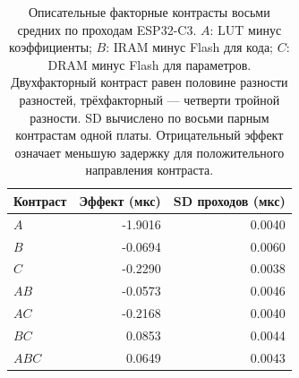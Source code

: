 \begin{table}[H]
\centering
\caption{Описательные факторные контрасты восьми средних по проходам ESP32-C3. $A$: LUT минус коэффициенты; $B$: IRAM минус Flash для кода; $C$: DRAM минус Flash для параметров. Двухфакторный контраст равен половине разности разностей, трёхфакторный --- четверти тройной разности. SD вычислено по восьми парным контрастам одной платы. Отрицательный эффект означает меньшую задержку для положительного направления контраста.}
\label{tab:c3-factorial}
\begin{tabular}{lrr}
\toprule
Контраст & Эффект (мкс) & SD проходов (мкс)\\
\midrule
$A$ & -1.9016 & 0.0040\\
$B$ & -0.0694 & 0.0060\\
$C$ & -0.2290 & 0.0038\\
$AB$ & -0.0573 & 0.0046\\
$AC$ & -0.2168 & 0.0040\\
$BC$ & 0.0853 & 0.0044\\
$ABC$ & 0.0649 & 0.0043\\
\bottomrule
\end{tabular}
\end{table}
